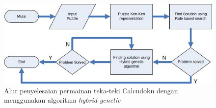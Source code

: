 \begin{figure}
\centering
\captionsetup{justification=centering}
\includegraphics[scale=1]{Gambar/HybridGenetic7}
\caption[Alur penyelesaian permainan teka-teki Calcudoku dengan menggunakan algoritma \textit{hybrid genetic} ~\cite{johanna:12:hybrid}]{Alur penyelesaian permainan teka-teki Calcudoku dengan menggunakan algoritma \textit{hybrid genetic} ~\cite{johanna:12:hybrid}}
\label{fig:hybrid7}
\end{figure}